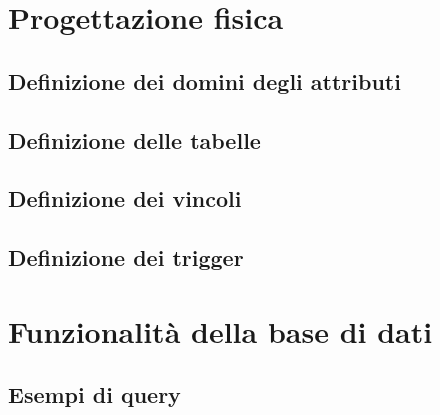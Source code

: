 \chapter{Progettazione fisica}

\section{Definizione dei domini degli attributi}

\section{Definizione delle tabelle}

\section{Definizione dei vincoli}

\section{Definizione dei trigger}

\chapter{Funzionalità della base di dati}

\section{Esempi di query} %
